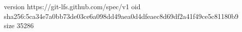 version https://git-lfs.github.com/spec/v1
oid sha256:5ca34e7a0bb73de03ce6a098dd49aea0d4dfeaec8d69df2a41f49ce5c81180b9
size 35286
